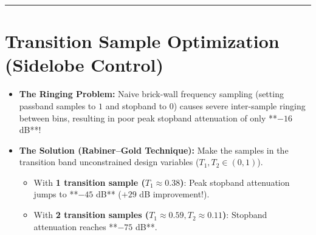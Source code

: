 \documentclass[11pt,a4paper]{article}
\begin{document}
\begin{table}[H]
\centering
\caption{Operational Closed-Form Frequency Sampling Formulas}
\label{tab:formulas}
\vspace{2mm}
\end{table}

\noindent\rule{\textwidth}{0.5pt}

\section{Transition Sample Optimization (Sidelobe Control)}

\begin{itemize}
    \item \textbf{The Ringing Problem:} Naive brick-wall frequency sampling (setting passband samples to $1$ and stopband to $0$) causes severe inter-sample ringing between bins, resulting in poor peak stopband attenuation of only **$-16$ dB**!
    \item \textbf{The Solution (Rabiner--Gold Technique):} Make the samples in the transition band unconstrained design variables ($T_1, T_2 \in (0, 1)$).
    \begin{itemize}
        \item With \textbf{1 transition sample ($T_1 \approx 0.38$)}: Peak stopband attenuation jumps to **$-45$ dB** ($+29$ dB improvement!).
        \item With \textbf{2 transition samples ($T_1 \approx 0.59, T_2 \approx 0.11$)}: Stopband attenuation reaches **$-75$ dB**.
    \end{itemize}
\end{itemize}
\end{document}
